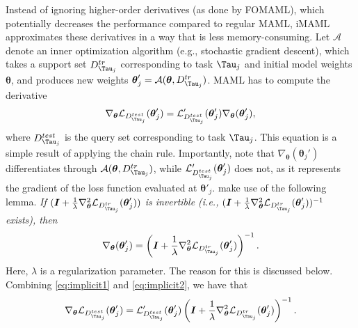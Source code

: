 Instead of ignoring higher-order derivatives (as done by FOMAML), which potentially decreases the performance compared to regular MAML, iMAML  approximates these derivatives in a way that is less memory-consuming. 
Let $\mathcal{A}$ denote an inner optimization algorithm (e.g., stochastic gradient descent), which takes a support set $D^{tr}_{\Tau_{j}}$ corresponding to task $\Tau_{j}$ and initial model weights $\boldsymbol{\theta}$, and produces new weights $\boldsymbol{\theta}'_{j} = \mathcal{A}(\boldsymbol{\theta}, D^{tr}_{\Tau_{j}})$. MAML has to compute the derivative 
\begin{align}
    \nabla_{\boldsymbol{\theta}} \mathcal{L}_{D^{test}_{\Tau_{j}}} (\boldsymbol{\theta}'_{j}) =  \mathcal{L}_{D^{test}_{\Tau_{j}}}'(\boldsymbol{\theta}'_{j})\nabla_{\boldsymbol{\theta}}(\boldsymbol{\theta}'_{j}) ,\label{eq:implicit1}
\end{align} where $D^{test}_{\Tau_{j}}$ is the query set corresponding to task $\Tau_{j}$. This equation is a simple result of applying the chain rule. Importantly, note that $\nabla_{\boldsymbol{\theta}}(\boldsymbol{\theta}_{j}')$ differentiates through $\mathcal{A}(\boldsymbol{\theta}, D^{tr}_{\Tau_{j}})$, while $ \mathcal{L}_{D^{test}_{\Tau_{j}}}'(\boldsymbol{\theta}'_{j})$ does not, as it represents the gradient of the loss function evaluated at $\boldsymbol{\theta}'_{j}$.  make use of the following lemma. 
\textit{If $(\boldsymbol{I} + \frac{1}{\lambda} \nabla^{2}_{\boldsymbol{\theta}}\mathcal{L}_{D^{tr}_{\Tau_{j}}}(\boldsymbol{\theta}'_{j}))$ is invertible (i.e., $(\boldsymbol{I} + \frac{1}{\lambda} \nabla^{2}_{\boldsymbol{\theta}}\mathcal{L}_{D^{tr}_{\Tau_{j}}}(\boldsymbol{\theta}'_{j}))^{-1}$ exists), then}
\begin{align}
    \nabla_{\boldsymbol{\theta}}(\boldsymbol{\theta}_{j}') = \left( \boldsymbol{I} + \frac{1}{\lambda} \nabla^{2}_{\boldsymbol{\theta}}\mathcal{L}_{D^{tr}_{\Tau_{j}}}(\boldsymbol{\theta}'_{j}) \right)^{-1}. \label{eq:implicit2}
\end{align} Here, $\lambda$ is a regularization parameter. The reason for this is discussed below.
Combining \autoref{eq:implicit1} and \autoref{eq:implicit2}, we have that 
\begin{align}
    \nabla_{\boldsymbol{\theta}} \mathcal{L}_{D^{test}_{\Tau_{j}}} (\boldsymbol{\theta}'_{j}) = \mathcal{L}'_{D^{test}_{\Tau_{j}}}(\boldsymbol{\theta}'_{j}) \left( \boldsymbol{I} + \frac{1}{\lambda} \nabla^{2}_{\boldsymbol{\theta}}\mathcal{L}_{D^{tr}_{\Tau_{j}}}(\boldsymbol{\theta}'_{j}) \right)^{-1}  .
\end{align}

